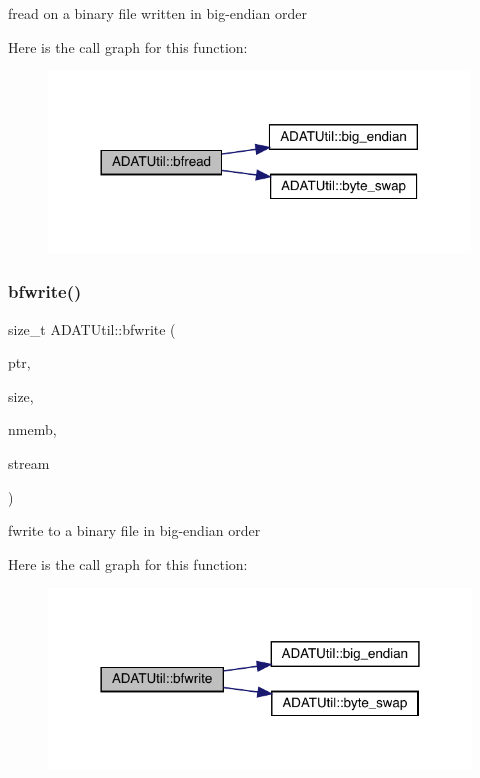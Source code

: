 fread on a binary file written in big-\/endian order 

Here is the call graph for this function\+:\nopagebreak
\begin{figure}[H]
\begin{center}
\leavevmode
\includegraphics[width=317pt]{de/d19/namespaceADATUtil_af41a672c512fa9828e3ada70420985c9_cgraph}
\end{center}
\end{figure}
\mbox{\label{namespaceADATUtil_afcbd366717135244eee5acb0d5ba86ac}} 
\subsubsection{\texorpdfstring{bfwrite()}{bfwrite()}}
{\footnotesize\ttfamily size\+\_\+t A\+D\+A\+T\+Util\+::bfwrite (\begin{DoxyParamCaption}\item[{void $\ast$}]{ptr,  }\item[{size\+\_\+t}]{size,  }\item[{size\+\_\+t}]{nmemb,  }\item[{F\+I\+LE $\ast$}]{stream }\end{DoxyParamCaption})}



fwrite to a binary file in big-\/endian order 

Here is the call graph for this function\+:\nopagebreak
\begin{figure}[H]
\begin{center}
\leavevmode
\includegraphics[width=318pt]{de/d19/namespaceADATUtil_afcbd366717135244eee5acb0d5ba86ac_cgraph}
\end{center}
\end{figure}
\mbox{\label{namespaceADATUtil_a7f9f0561f3ffcb562067ebedbade089f}} 
